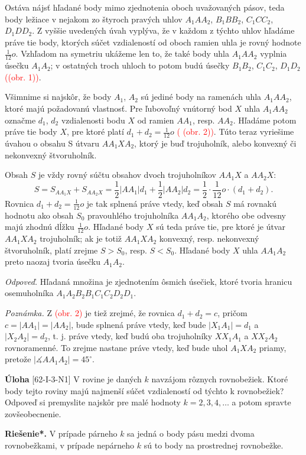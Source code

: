 \documentclass{article}
\newcommand{\rieh}{\textbf{Riešenie*.} }
\newcommand{\ma}{\measuredangle}
\newcommand\todo[1]{\noindent\textcolor{red}{(#1)}}
\newcommand{\problem}[3]{
  \begin{tcolorbox}[breakable,notitle,boxrule=0pt,colback=light-gray,colframe=light-gray]
    \textbf{Úloha}
    [#1] #2
  \end{tcolorbox}
  \noindent#3
}
\begin{document}
{\begin{enumerate}[(1)]
\end{enumerate}
Ostáva nájsť hľadané body mimo zjednotenia oboch uvažovaných pásov, teda body ležiace v nejakom zo štyroch
pravých uhlov $A_1 AA_2$, $B_1 BB_2$, $C_1 CC_2$, $D_1 DD_2$. Z vyššie uvedených úvah vyplýva, že v každom z týchto uhlov hľadáme práve tie body, ktorých súčet vzdialeností od oboch ramien uhla je rovný hodnote $\frac{1}{12}o$. Vzhľadom na symetriu ukážeme len to, že také body uhla $A_1 AA_2$ vyplnia úsečku $A_1 A_2$; v ostatných troch uhloch to potom budú úsečky $B_1 B_2$, $C_1 C_2$, $D_1 D_2$ \todo{(obr. 1)}.

Všimnime si najskôr, že body $A_1$, $A_2$ sú jediné body na ramenách uhla $A_1 AA_2$, ktoré majú požadovanú vlastnosť. Pre ľubovoľný vnútorný bod $X$ uhla $A_1 AA_2$ označme $d_1$, $d_2$ vzdialenosti bodu $X$ od ramien $AA_1$, resp. $AA_2$. Hľadáme potom práve tie body $X$, pre ktoré platí $d_1 +d_2 =\frac{1}{12}o$ \todo{ (obr. 2)}. Túto  teraz vyriešime úvahou o obsahu S útvaru $AA_1 XA_2$, ktorý je buď trojuholník, alebo konvexný či nekonvexný štvoruholník.

Obsah $S$ je vždy rovný súčtu obsahov dvoch trojuholníkov $AA_1 X$ a $AA_2 X$:
$$S = S_{AA_1 X} + S_{AA_2 X} =\frac{1}{2}|AA_1 |d_1 + \frac{1}{2}|AA_2 |d_2 = \frac{1}{2} \cdot \frac{1}{12}o \cdot (d_1 + d_2 ).$$
Rovnica $d_1 +d_2 =\frac{1}{12}o$ je tak splnená práve vtedy, keď obsah $S$ má rovnakú hodnotu ako obsah $S_0$ pravouhlého trojuholníka $AA_1 A_2$, ktorého obe odvesny majú zhodnú dĺžku $\frac{1}{12}o$. Hľadané body $X$ sú teda práve tie, pre ktoré je útvar $AA_1 XA_2$ trojuholník; ak je totiž $AA_1 XA_2$ konvexný, resp. nekonvexný štvoruholník, platí zrejme $S > S_0$, resp. $S < S_0$. Hľadané body $X$ uhla $AA_1 A_2$ preto naozaj tvoria úsečku $A_1 A_2$.

\textit{Odpoveď.} Hľadaná množina je zjednotením ôsmich úsečiek, ktoré tvoria hranicu osemuholníka $A_1 A_2 B_2 B_1 C_1 C_2 D_2 D_1$.

\textit{Poznámka.} Z \todo{obr. 2} je tiež zrejmé, že rovnica $d_1 + d_2 = c$, pričom $c = |AA_1 | = |AA_2|$, bude splnená práve vtedy, keď bude $|X_1 A_1 | = d_1$ a $|X_2 A_2| = d_2$, t. j. práve vtedy, keď budú oba trojuholníky $XX_1 A_1$ a $XX_2 A_2$ rovnoramenné. To zrejme nastane práve vtedy, keď bude uhol $A_1 XA_2$ priamy, pretože $|\ma AA_1 A_2 | = 45^\circ$.
}


\problem{62-I-3-N1}{
V rovine je daných $k$ navzájom rôznych rovnobežiek. Ktoré body tejto roviny majú najmenší súčet vzdialeností od týchto k rovnobežiek? Odpoveď si premyslite najskôr pre malé hodnoty $k = 2, 3, 4, \ldots$ a potom spravte zovšeobecnenie.
}{
\rieh V prípade párneho $k$ sa jedná o body pásu medzi dvoma \uv{prostrednými} rovnobežkami, v prípade nepárneho $k$ sú to body na prostrednej rovnobežke.
}
\end{document}
